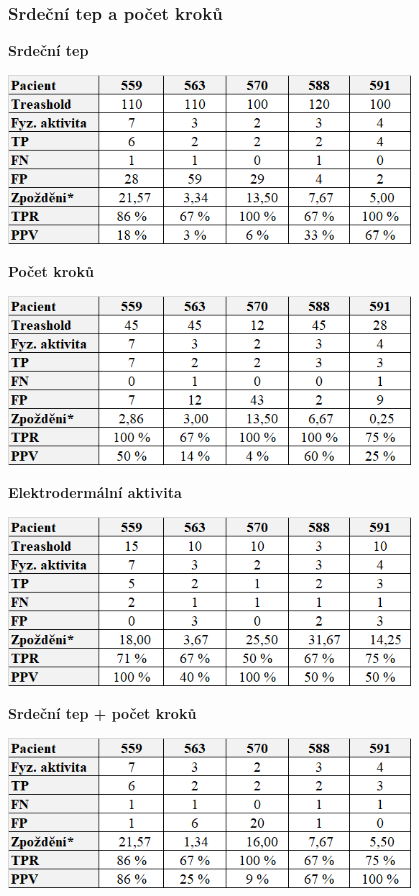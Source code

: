 \subsubsection*{Srdeční tep a počet kroků}

\begin{table}[H]
\caption{\textbf{Srdeční tep}}
\label{tab:vys:heart}
\centering
\includegraphics[width=0.8\textwidth]{img/vysledky/pa/1_heart.png}
\end{table}

\begin{table}[H]
\caption{\textbf{Počet kroků}}
\vspace*{1mm}
\centering
\includegraphics[width=0.8\textwidth]{img/vysledky/pa/2_steps.png}
\end{table}

\begin{table}[H]
\caption{\textbf{Elektrodermální aktivita}}
\vspace*{1mm}
\centering
\includegraphics[width=0.8\textwidth]{img/vysledky/pa/3_elektro.png}
\end{table}

\begin{table}[H]
\caption{\textbf{Srdeční tep + počet kroků}}
\centering
\includegraphics[width=0.8\textwidth]{img/vysledky/pa/4_heart_steps.png}
\end{table}

